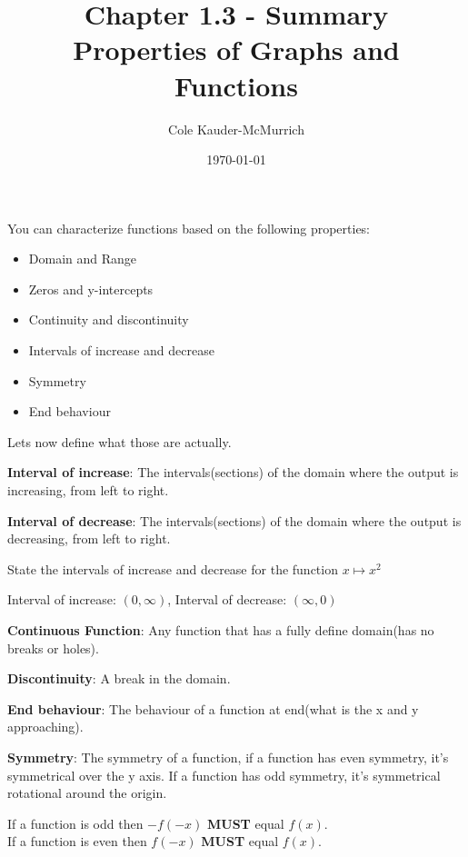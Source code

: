 \documentclass{exam}
\title{\Huge{Chapter 1.3 - Summary}\\\huge{Properties of Graphs and Functions}}
\author{Cole Kauder-McMurrich}
\date{\today}
\begin{document}
    \maketitle

    You can characterize functions based on the following properties:
    \begin{itemize}
        \item Domain and Range
        \item Zeros and y-intercepts
        \item Continuity and discontinuity
        \item Intervals of increase and decrease
        \item Symmetry
        \item End behaviour
    \end{itemize}

    Lets now define what those are actually.

    \textbf{Interval of increase}: The intervals(sections) of the domain where the output is increasing, from left to right.

    \textbf{Interval of decrease}: The intervals(sections) of the domain where the output is decreasing, from left to right.

    State the intervals of increase and decrease for the function \(x \mapsto x^2 \)

    Interval of increase: \((0, \infty)\),
    Interval of decrease: \((\infty, 0)\)

    \textbf{Continuous Function}: Any function that has a fully define domain(has no breaks or holes).

    \textbf{Discontinuity}: A break in the domain.

    \textbf{End behaviour}: The behaviour of a function at end(what is the x and y approaching).

    \textbf{Symmetry}: The symmetry of a function, if a function has even symmetry, it's symmetrical over the y axis. If a function has odd symmetry, it's symmetrical rotational around the origin.

    If a function is odd then \(-f(-x)\) \textbf{MUST} equal \(f(x)\).\\ 
    If a function is even then \(f(-x)\) \textbf{MUST} equal \(f(x)\).
\end{document}

